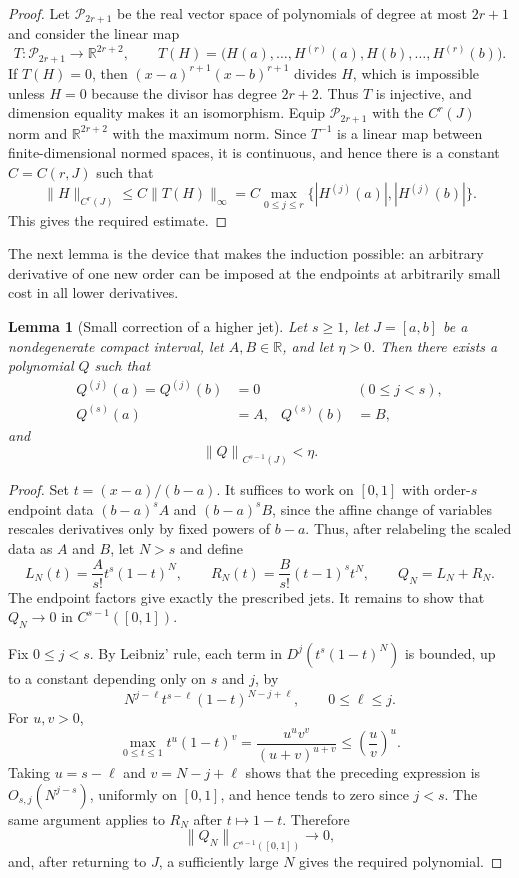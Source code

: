 \documentclass[11pt,reqno]{amsart}
\numberwithin{equation}{section}
\newtheorem{lemma}[theorem]{Lemma}
\theoremstyle{definition}
\theoremstyle{remark}
\newcommand{\R}{\mathbb R}
\newcommand{\norm}[1]{\left\lVert #1\right\rVert}
\begin{document}
\begin{proof}
Let $\mathcal P_{2r+1}$ be the real vector space of polynomials of degree at most $2r+1$ and consider the linear map
\[
T:\mathcal P_{2r+1}\longrightarrow\R^{2r+2},
\qquad
T(H)
=\bigl(H(a),\dots,H^{(r)}(a),H(b),\dots,H^{(r)}(b)\bigr).
\]
If $T(H)=0$, then $(x-a)^{r+1}(x-b)^{r+1}$ divides $H$, which is impossible unless $H=0$ because the divisor has degree $2r+2$. Thus $T$ is injective, and dimension equality makes it an isomorphism. Equip $\mathcal P_{2r+1}$ with the $C^r(J)$ norm and $\R^{2r+2}$ with the maximum norm. Since $T^{-1}$ is a linear map between finite-dimensional normed spaces, it is continuous, and hence there is a constant $C=C(r,J)$ such that
\[
\|H\|_{C^r(J)}
\leq C\|T(H)\|_\infty
=
C\max_{0\leq j\leq r}\{|H^{(j)}(a)|,|H^{(j)}(b)|\}.
\]
This gives the required estimate.
\end{proof}

The next lemma is the device that makes the induction possible: an arbitrary derivative of one new order can be imposed at the endpoints at arbitrarily small cost in all lower derivatives.

\begin{lemma}[Small correction of a higher jet]\label{lem:high-jet}
Let $s\geq1$, let $J=[a,b]$ be a nondegenerate compact interval,
let $A,B\in\R$, and let $\eta>0$. Then there exists a polynomial $Q$ such that
\begin{align*}
Q^{(j)}(a)=Q^{(j)}(b)&=0 &&(0\leq j<s),\\
Q^{(s)}(a)&=A, & Q^{(s)}(b)&=B,
\end{align*}
and
\[
\norm{Q}_{C^{s-1}(J)}<\eta.
\]
\end{lemma}

\begin{proof}
Set $t=(x-a)/(b-a)$. It suffices to work on $[0,1]$ with order-$s$
endpoint data $(b-a)^sA$ and $(b-a)^sB$, since the affine change of
variables rescales derivatives only by fixed powers of $b-a$. Thus, after
relabeling the scaled data as $A$ and $B$, let $N>s$ and define
\[
L_N(t)=\frac{A}{s!}t^s(1-t)^N,
\qquad
R_N(t)=\frac{B}{s!}(t-1)^st^N,
\qquad
Q_N=L_N+R_N.
\]
The endpoint factors give exactly the prescribed jets. It remains to show
that $Q_N\to0$ in $C^{s-1}([0,1])$.

Fix $0\leq j<s$. By Leibniz' rule, each term in
$D^j(t^s(1-t)^N)$ is bounded, up to a constant depending only on $s$ and
$j$, by
\[
N^{j-\ell}t^{s-\ell}(1-t)^{N-j+\ell},
\qquad 0\leq\ell\leq j.
\]
For $u,v>0$,
\[
\max_{0\leq t\leq1}t^u(1-t)^v
=\frac{u^uv^v}{(u+v)^{u+v}}
\leq\left(\frac{u}{v}\right)^u.
\]
Taking $u=s-\ell$ and $v=N-j+\ell$ shows that the preceding expression is
$O_{s,j}(N^{j-s})$, uniformly on $[0,1]$, and hence tends to zero since
$j<s$. The same argument applies to $R_N$ after $t\mapsto1-t$. Therefore
\[
\norm{Q_N}_{C^{s-1}([0,1])}\longrightarrow0,
\]
and, after returning to $J$, a sufficiently large $N$ gives the required
polynomial.
\end{proof}
\end{document}
